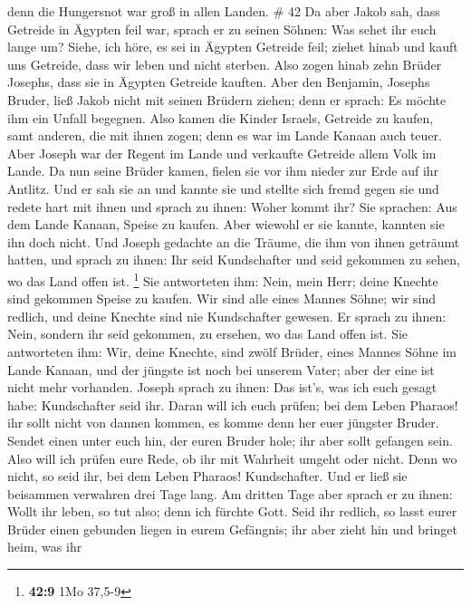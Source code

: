 denn die Hungersnot war groß in allen Landen. \# 42  Da
aber Jakob sah, dass Getreide in Ägypten feil war, sprach er zu seinen
Söhnen: Was sehet ihr euch lange um?  Siehe, ich höre, es
sei in Ägypten Getreide feil; ziehet hinab und kauft uns Getreide, dass
wir leben und nicht sterben.  Also zogen hinab zehn Brüder
Josephs, dass sie in Ägypten Getreide kauften.  Aber den
Benjamin, Josephs Bruder, ließ Jakob nicht mit seinen Brüdern ziehen;
denn er sprach: Es möchte ihm ein Unfall begegnen.  Also
kamen die Kinder Israels, Getreide zu kaufen, samt anderen, die mit
ihnen zogen; denn es war im Lande Kanaan auch teuer.  Aber
Joseph war der Regent im Lande und verkaufte Getreide allem Volk im
Lande. Da nun seine Brüder kamen, fielen sie vor ihm nieder zur Erde auf
ihr Antlitz.  Und er sah sie an und kannte sie und stellte
sich fremd gegen sie und redete hart mit ihnen und sprach zu ihnen:
Woher kommt ihr? Sie sprachen: Aus dem Lande Kanaan, Speise zu kaufen.
 Aber wiewohl er sie kannte, kannten sie ihn doch nicht.
 Und Joseph gedachte an die Träume, die ihm von ihnen
geträumt hatten, und sprach zu ihnen: Ihr seid Kundschafter und seid
gekommen zu sehen, wo das Land offen ist. \footnote{\textbf{42:9} 1Mo
  37,5-9}  Sie antworteten ihm: Nein, mein Herr; deine
Knechte sind gekommen Speise zu kaufen.  Wir sind alle
eines Mannes Söhne; wir sind redlich, und deine Knechte sind nie
Kundschafter gewesen.  Er sprach zu ihnen: Nein, sondern
ihr seid gekommen, zu ersehen, wo das Land offen ist. 
Sie antworteten ihm: Wir, deine Knechte, sind zwölf Brüder, eines Mannes
Söhne im Lande Kanaan, und der jüngste ist noch bei unserem Vater; aber
der eine ist nicht mehr vorhanden.  Joseph sprach zu
ihnen: Das ist's, was ich euch gesagt habe: Kundschafter seid ihr.
 Daran will ich euch prüfen; bei dem Leben Pharaos! ihr
sollt nicht von dannen kommen, es komme denn her euer jüngster Bruder.
 Sendet einen unter euch hin, der euren Bruder hole; ihr
aber sollt gefangen sein. Also will ich prüfen eure Rede, ob ihr mit
Wahrheit umgeht oder nicht. Denn wo nicht, so seid ihr, bei dem Leben
Pharaos! Kundschafter.  Und er ließ sie beisammen
verwahren drei Tage lang.  Am dritten Tage aber sprach er
zu ihnen: Wollt ihr leben, so tut also; denn ich fürchte Gott.
 Seid ihr redlich, so lasst eurer Brüder einen gebunden
liegen in eurem Gefängnis; ihr aber zieht hin und bringet heim, was ihr
